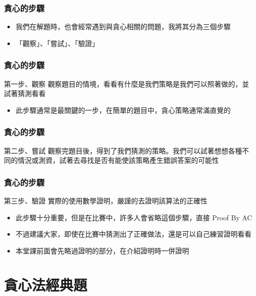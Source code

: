 \documentclass[aspectratio=169]{beamer}
\begin{document}
\begin{frame}
\frametitle{貪心的步驟}
    \begin{itemize}
    \item<1-> 我們在解題時，也會經常遇到與貪心相關的問題，我將其分為三個步驟
    \item<1-> 「觀察」、「嘗試」、「驗證」
    \end{itemize}
\end{frame}

\begin{frame}
\frametitle{貪心的步驟}
    \begin{alertblock}{第一步、觀察}
        觀察題目的情境，看看有什麼是我們策略是我們可以照著做的，並試著猜測看看
    \end{alertblock}
    
    \begin{itemize}
    \item<1-> 此步驟通常是最關鍵的一步，在簡單的題目中，貪心策略通常滿直覺的
    \end{itemize}
\end{frame}

\begin{frame}
\frametitle{貪心的步驟}
    \begin{alertblock}{第二步、嘗試}
        觀察完題目後，得到了我們猜測的策略。我們可以試著想想各種不同的情況或測資，試著去尋找是否有能使該策略產生錯誤答案的可能性
    \end{alertblock}
\end{frame}

\begin{frame}
\frametitle{貪心的步驟}
    \begin{alertblock}{第三步、驗證}
        實際的使用數學證明，嚴謹的去證明該算法的正確性
    \end{alertblock}
    
    \begin{itemize}
    \item<1-> 此步驟十分重要，但是在比賽中，許多人會省略這個步驟，直接 Proof By AC
    \item<1-> 不過建議大家，即使在比賽中猜測出了正確做法，還是可以自己練習證明看看
    \item<2-> 本堂課前面會先略過證明的部分，在介紹證明時一併證明
    \end{itemize}
\end{frame}

\section{貪心法經典題}
\end{document}
